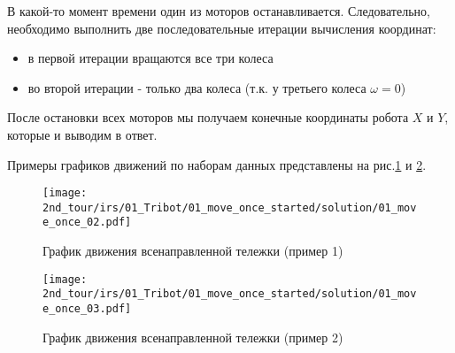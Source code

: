 В какой-то момент времени один из моторов останавливается. Следовательно, необходимо выполнить две последовательные итерации вычисления координат: 
\begin{itemize}
	\item в первой итерации вращаются все три колеса
	\item во второй итерации - только два колеса (т.к. у третьего колеса $\omega = 0$)
\end{itemize}

После остановки всех моторов мы получаем конечные координаты робота $X$ и $Y$, которые и выводим в ответ.

Примеры графиков движений по наборам данных представлены на рис.\ref{fig:01_move_once_02} и \ref{fig:01_move_once_03}.

\begin{figure}[h!]
	\centering
	\texttt{[image: 2nd\_tour/irs/01\_Tribot/01\_move\_once\_started/solution/01\_move\_once\_02.pdf]}
	\caption{График движения всенаправленной тележки (пример 1)}
	\label{fig:01_move_once_02}
\end{figure}
\begin{figure}[h!]
	\centering
	\texttt{[image: 2nd\_tour/irs/01\_Tribot/01\_move\_once\_started/solution/01\_move\_once\_03.pdf]}
	\caption{График движения всенаправленной тележки (пример 2)}
	\label{fig:01_move_once_03}
\end{figure}


\codeExample

{}